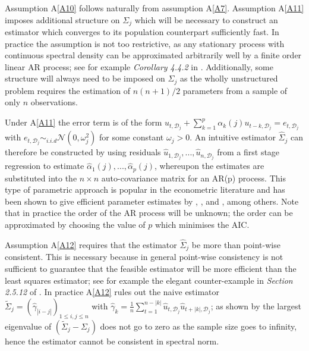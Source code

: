 \documentclass[11pt]{report}\usepackage[utf8]{inputenc}
\begin{document}
Assumption A\ref{A10} follows naturally from assumption A\ref{A7}. Assumption A\ref{A11} imposes additional structure on $\Sigma_j$ which will be necessary to construct an estimator which converges to its population counterpart sufficiently fast. In practice the assumption is not too restrictive, as any stationary process with continuous spectral density  can be approximated arbitrarily well by a finite order linear AR process; see for example \textit{Corollary 4.4.2} in \cite{brockwell1991time}. Additionally, some structure will always need to be imposed on $\Sigma_j$ as the wholly unstructured problem requires the estimation of $n(n+1)/2$ parameters from a sample of only $n$ observations. 

Under A\ref{A11} the error term is of the form $u_{t,\mathcal{D}_j} + \sum_{k=1}^{p} \alpha_{k}(j) u_{t-k,\mathcal{D}_j} = e_{t,\mathcal{D}_j}$ with $e_{t,\mathcal{D}_j} \sim_{i.i.d} \mathcal{N}( 0,\omega_j^2 )$ for some constant $\omega_j>0$. An intuitive estimator $\widehat{\Sigma}_j$ can therefore be constructed by using residuals $\widehat{u}_{1,\mathcal{D}_j},...,\widehat{u}_{n,\mathcal{D}_j}$ from a first stage regression to estimate $\widehat{\alpha}_1(j),...,\widehat{\alpha}_p(j)$, whereupon the estimates are substituted into the $n \times n$ auto-covariance matrix for an AR(p) process. This type of parametric approach is popular in the econometric literature and has been shown to give efficient parameter estimates by \cite{amemiya1973generalized}, \cite{wickens1969consistency}, and \cite{koreisha2001generalized}, among others. Note that in practice the order of the AR process will be unknown; the order can be approximated by choosing the value of $p$ which minimises the AIC. 

Assumption A\ref{A12} requires that the estimator $\widehat{\Sigma}_j$ be more than point-wise consistent. This is necessary because in general point-wise consistency is not sufficient to guarantee that the feasible estimator will be more efficient than the least squares estimator; see for example the elegant counter-example in \textit{Section 2.5.12} of \cite{schmidt_1976}. In practice A\ref{A12} rules out the naive estimator $\widetilde{\Sigma}_j = \left ( \widehat{\gamma}_{|i-j|} \right )_{1\leq i,j \leq n}$ with $\widehat{\gamma}_k = \frac{1}{n}\sum_{t=1}^{n-|k|}\widehat{u}_{t,\mathcal{D}_j}\widehat{u}_{t+|k|,\mathcal{D}_j}$; as shown by \cite{wu2009banding} the largest eigenvalue of $\left ( \widetilde{\Sigma}_j - \Sigma_j \right )$ does not go to zero as the sample size goes to infinity, hence the estimator cannot be consistent in spectral norm. 
\end{document}
